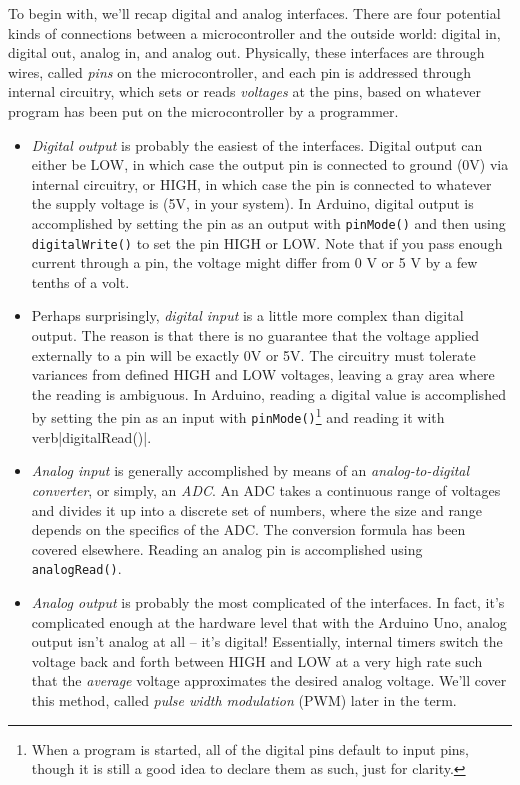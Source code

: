 \documentclass[11pt]{article} %
\begin{document}
To begin with, we’ll recap digital and analog interfaces. There are four potential kinds of connections between a microcontroller and the outside world: digital in, digital out, analog in, and analog out. Physically, these interfaces are through wires, called \emph{pins} on the microcontroller, and each pin is addressed through internal circuitry, which sets or reads \emph{voltages} at the pins, based on whatever program has been put on the microcontroller by a programmer.


\begin{itemize}
\item \emph{Digital output} is probably the easiest of the interfaces. Digital output can either be LOW, in which case the output pin is connected to ground (0V) via internal circuitry, or HIGH, in which case the pin is connected to whatever the supply voltage is (5V, in your system). In Arduino, digital output is accomplished by setting the pin as an output with \verb|pinMode()| and then using \verb|digitalWrite()| to set the pin HIGH or LOW. Note that if you pass enough current through a pin, the voltage might differ from 0 V or 5 V by a few tenths of a volt.
\item Perhaps surprisingly, \emph{digital input} is a little more complex than digital output. The reason is that there is no guarantee that the voltage applied externally to a pin will be exactly 0V or 5V. The circuitry must tolerate variances from defined HIGH and LOW voltages, leaving a gray area where the reading is ambiguous. In Arduino, reading a digital value is accomplished by setting the pin as an input with \verb|pinMode()|\footnote{When a program is started, all of the digital pins default to input pins, though it is still a good idea to declare them as such, just for clarity.} and reading it with verb|digitalRead()|.
\item \emph{Analog input} is generally accomplished by means of an \emph{analog-to-digital converter}, or simply, an \emph{ADC}. An ADC takes a continuous range of voltages and divides it up into a discrete set of numbers, where the size and range depends on the specifics of the ADC. The conversion formula has been covered elsewhere. Reading an analog pin is accomplished using \verb|analogRead()|.
\item \emph{Analog output} is probably the most complicated of the interfaces. In fact, it's complicated enough at the hardware level that with the Arduino Uno, analog output isn't analog at all -- it's digital! Essentially, internal timers switch the voltage back and forth between HIGH and LOW at a very high rate such that the \emph{average} voltage approximates the desired analog voltage. We’ll cover this method, called \emph{pulse width modulation} (PWM) later in the term.
\end{itemize}
\end{document}
